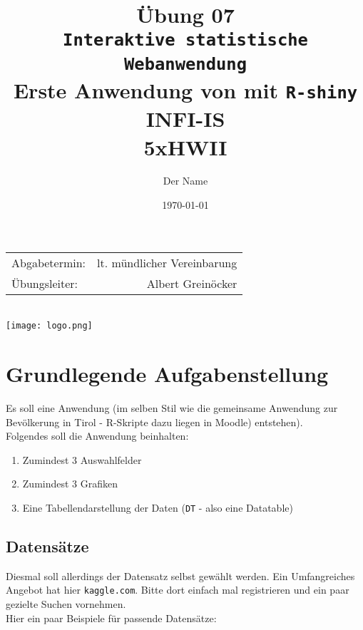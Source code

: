 \documentclass{article}
\title{Übung 07 \\ \texttt{Interaktive statistische Webanwendung} \\ Erste Anwendung von mit \texttt{R-shiny} \\ INFI-IS \\ 5xHWII}
\author{Der Name} %
\date{\today} %
\begin{document}
\maketitle %

\begin{center}
\begin{tabular}{l r}
Abgabetermin: &  lt. mündlicher Vereinbarung \\
Übungsleiter: & Albert Greinöcker %
\end{tabular} \\ 
\vspace{1cm}
\texttt{[image: logo.png]}
\end{center}


\section{Grundlegende Aufgabenstellung}

Es soll eine Anwendung (im selben Stil wie die gemeinsame Anwendung zur Bevölkerung in Tirol - R-Skripte dazu liegen in Moodle) entstehen). \\

Folgendes soll die Anwendung beinhalten:

\begin{enumerate}
	\item Zumindest 3 Auswahlfelder
	\item Zumindest 3 Grafiken
	\item Eine Tabellendarstellung der Daten (\texttt{DT} -  also eine Datatable)
\end{enumerate}



\subsection{Datensätze}

Diesmal soll allerdings der Datensatz selbst gewählt werden. Ein Umfangreiches Angebot hat hier \texttt{kaggle.com}. Bitte dort einfach mal registrieren und ein paar gezielte Suchen vornehmen. \\

Hier ein paar Beispiele für passende Datensätze:
\end{document}
